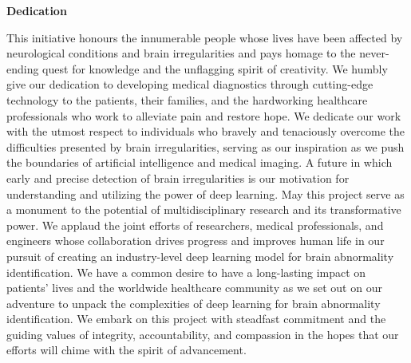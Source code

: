 \begin{center}
    \huge \textbf{Dedication}
\end{center}
\vspace{15mm}
This initiative honours the innumerable people whose lives have been affected by neurological conditions and brain irregularities and pays homage to the never-ending quest for knowledge and the unflagging spirit of creativity. We humbly give our dedication to developing medical diagnostics through cutting-edge technology to the patients, their families, and the hardworking healthcare professionals who work to alleviate pain and restore hope. We dedicate our work with the utmost respect to individuals who bravely and tenaciously overcome the difficulties presented by brain irregularities, serving as our inspiration as we push the boundaries of artificial intelligence and medical imaging. A future in which early and precise detection of brain irregularities is our motivation for understanding and utilizing the power of deep learning. May this project serve as a monument to the potential of multidisciplinary research and its transformative power. We applaud the joint efforts of researchers, medical professionals, and engineers whose collaboration drives progress and improves human life in our pursuit of creating an industry-level deep learning model for brain abnormality identification. We have a common desire to have a long-lasting impact on patients' lives and the worldwide healthcare community as we set out on our adventure to unpack the complexities of deep learning for brain abnormality identification. We embark on this project with steadfast commitment and the guiding values of integrity, accountability, and compassion in the hopes that our efforts will chime with the spirit of advancement.